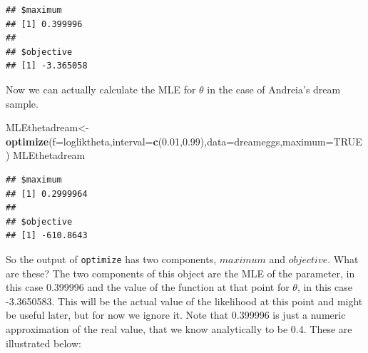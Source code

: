 \documentclass[
]{book}
\newenvironment{Shaded}{\begin{snugshade}}{\end{snugshade}}
\newcommand{\CommentTok}[1]{\textcolor[rgb]{0.56,0.35,0.01}{\textit{#1}}}
\newcommand{\ControlFlowTok}[1]{\textcolor[rgb]{0.13,0.29,0.53}{\textbf{#1}}}
\newcommand{\DataTypeTok}[1]{\textcolor[rgb]{0.13,0.29,0.53}{#1}}
\newcommand{\DecValTok}[1]{\textcolor[rgb]{0.00,0.00,0.81}{#1}}
\newcommand{\FloatTok}[1]{\textcolor[rgb]{0.00,0.00,0.81}{#1}}
\newcommand{\KeywordTok}[1]{\textcolor[rgb]{0.13,0.29,0.53}{\textbf{#1}}}
\newcommand{\NormalTok}[1]{#1}
\newcommand{\OperatorTok}[1]{\textcolor[rgb]{0.81,0.36,0.00}{\textbf{#1}}}
\newcommand{\OtherTok}[1]{\textcolor[rgb]{0.56,0.35,0.01}{#1}}
\newcommand{\StringTok}[1]{\textcolor[rgb]{0.31,0.60,0.02}{#1}}
\begin{document}
\begin{verbatim}
## $maximum
## [1] 0.399996
## 
## $objective
## [1] -3.365058
\end{verbatim}

Now we can actually calculate the MLE for \(\theta\) in the case of Andreia's dream sample.

\begin{Shaded}
\begin{Highlighting}[]
\NormalTok{MLEthetadream<-}\KeywordTok{optimize}\NormalTok{(}\DataTypeTok{f=}\NormalTok{logliktheta,}\DataTypeTok{interval=}\KeywordTok{c}\NormalTok{(}\FloatTok{0.01}\NormalTok{,}\FloatTok{0.99}\NormalTok{),}\DataTypeTok{data=}\NormalTok{dreameggs,}\DataTypeTok{maximum=}\OtherTok{TRUE}\NormalTok{)}
\NormalTok{MLEthetadream}
\end{Highlighting}
\end{Shaded}

\begin{verbatim}
## $maximum
## [1] 0.2999964
## 
## $objective
## [1] -610.8643
\end{verbatim}

So the output of \texttt{optimize} has two components, \(maximum\) and \(objective\). What are these?
The two components of this object are the MLE of the parameter, in this case 0.399996 and the value of the function at that point for \(\theta\), in this case -3.3650583. This will be the actual value of the likelihood at this point and might be useful later, but for now we ignore it. Note that 0.399996 is just a numeric approximation of the real value, that we know analytically to be 0.4. These are illustrated below:

\begin{Shaded}
\end{Shaded}
\end{document}
